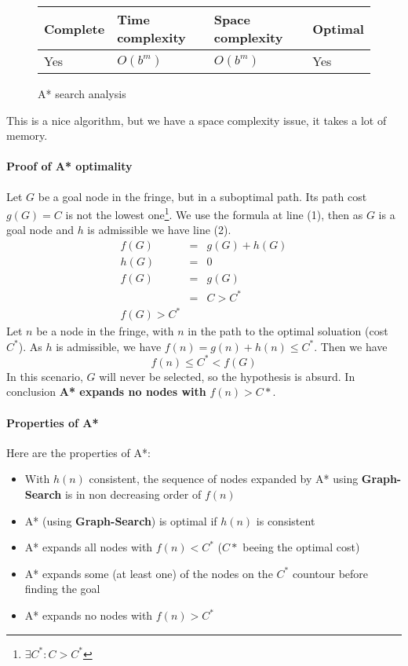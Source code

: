 \begin{figure}[H]
\centering
\begin{tabular}{|llll|}
\hline
\textbf{Complete} & \textbf{Time complexity} & \textbf{Space complexity} & \textbf{Optimal} \\
\hline
Yes & $O(b^m)$ & $O(b^m)$ & Yes\\
\hline
\end{tabular}
\caption{A* search analysis}
\end{figure}

This is a nice algorithm, but we have a space complexity issue, it takes a lot of memory.

\paragraph{Proof of A* optimality}

Let $G$ be a goal node in the fringe, but in a suboptimal path. Its path cost $g(G)=C$ is not the lowest one\footnote{$\exists C^* : C > C^*$}. We use the formula at line (1), then as $G$ is a goal node and $h$ is admissible we have line (2). 
\begin{eqnarray}
f(G) &=& g(G) + h(G)\\
h(G) &=& 0\\
f(G) &=& g(G)\\
&=& C > C^*\\
f(G) > C^*
\end{eqnarray}
Let $n$ be a node in the fringe, with $n$ in the path to the optimal soluation (cost $C^*$). As $h$ is admissible, we have $f(n) = g(n) + h(n) \leq C^*$. Then we have
$$f(n) \leq C^* < f(G)$$
In this scenario, $G$ will never be selected, so the hypothesis is absurd. In conclusion \textbf{A* expands no nodes with} $f(n) > C*$.
\paragraph{Properties of A*}

Here are the properties of A*:
\begin{itemize}
\item With $h(n)$ consistent, the sequence of nodes expanded by A* using \textbf{Graph-Search} is in non decreasing order of $f(n)$
\item A* (using \textbf{Graph-Search}) is optimal if $h(n)$ is consistent
\item A* expands all nodes with $f(n) < C^*$ ($C*$ beeing the optimal cost)
\item A* expands some (at least one) of the nodes on the $C^*$ countour before finding the goal
\item A* expands no nodes with $f(n) > C^*$ 
\end{itemize}

